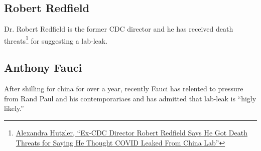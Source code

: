 \documentclass[11pt]{article}
\begin{document}
\subsection{Robert Redfield}
\label{sec:orgd8cbb4e}
Dr. Robert Redfield is the former CDC director and he has received death threats\footnote{\href{https://www.msn.com/en-us/health/medical/ex-cdc-director-robert-redfield-says-he-got-death-threats-for-saying-he-thought-covid-leaked-from-china-lab/ar-AAKGvCI}{Alexandra Hutzler, ``Ex-CDC Director Robert Redfield Says He Got Death Threats for Saying He Thought COVID Leaked From China Lab''}} for suggesting a lab-leak.
\subsection{Anthony Fauci}
\label{sec:org1f144f8}
After shilling for china for over a year, recently Fauci has relented to pressure from Rand Paul and his contemporariaes and has admitted that lab-leak is ``higly likely.''
\end{document}
